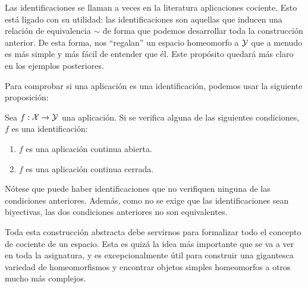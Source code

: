 Las identificaciones se llaman a veces en la literatura aplicaciones cociente. Esto está ligado con su utilidad: las identificaciones son aquellas que inducen una relación de equivalencia $\sim$ de forma que podemos desarrollar toda la construcción anterior. De esta forma, nos ``regalan'' un espacio homeomorfo a $\mathcal{Y}$ que a menudo es más simple y más fácil de entender que él. Este propósito quedará más claro en los ejemplos posteriores.

Para comprobar si una aplicación es una identificación, podemos usar la siguiente proposición:

\begin{prop}
	Sea $f:\mathcal{X}\to\mathcal{Y}$ una aplicación. Si se verifica alguna de las siguientes condiciones, $f$ es una identificación:
	\begin{enumerate}
		\item $f$ es una aplicación continua abierta.
		\item $f$ es una aplicación continua cerrada.
	\end{enumerate}
\end{prop}

Nótese que puede haber identificaciones que no verifiquen ninguna de las condiciones anteriores. Además, como no se exige que las identificaciones sean biyectivas, las dos condiciones anteriores no son equivalentes.

Toda esta construcción abstracta debe servirnos para formalizar todo el concepto de cociente de un espacio. Esta es quizá la idea más importante que se va a ver en toda la asignatura, y es excepcionalmente útil para construir una gigantesca variedad de homeomorfismos y encontrar objetos simples homeomorfos a otros mucho más complejos.



